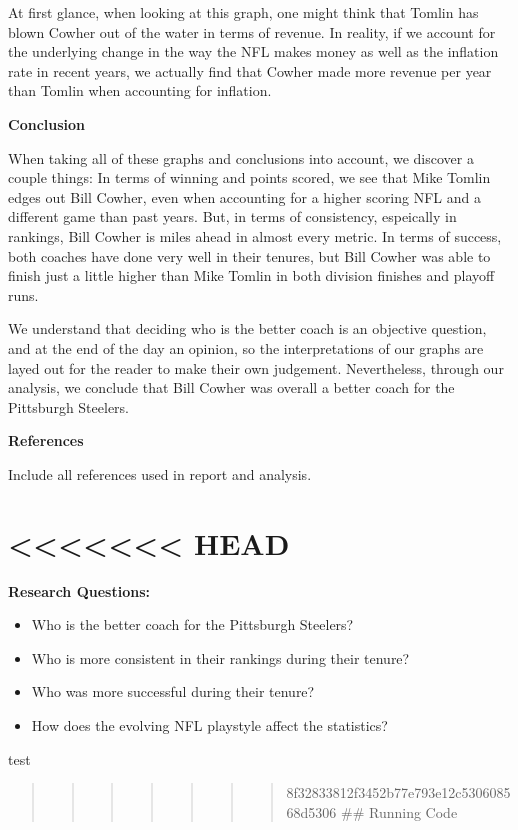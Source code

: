\documentclass[
  letterpaper,
  DIV=11,
  numbers=noendperiod]{scrartcl}
\begin{document}
At first glance, when looking at this graph, one might think that Tomlin
has blown Cowher out of the water in terms of revenue. In reality, if we
account for the underlying change in the way the NFL makes money as well
as the inflation rate in recent years, we actually find that Cowher made
more revenue per year than Tomlin when accounting for inflation.

\textbf{Conclusion}

When taking all of these graphs and conclusions into account, we
discover a couple things: In terms of winning and points scored, we see
that Mike Tomlin edges out Bill Cowher, even when accounting for a
higher scoring NFL and a different game than past years. But, in terms
of consistency, espeically in rankings, Bill Cowher is miles ahead in
almost every metric. In terms of success, both coaches have done very
well in their tenures, but Bill Cowher was able to finish just a little
higher than Mike Tomlin in both division finishes and playoff runs.

We understand that deciding who is the better coach is an objective
question, and at the end of the day an opinion, so the interpretations
of our graphs are layed out for the reader to make their own judgement.
Nevertheless, through our analysis, we conclude that Bill Cowher was
overall a better coach for the Pittsburgh Steelers.

\textbf{References}

Include all references used in report and analysis.

\section{\textless\textless\textless\textless\textless\textless\textless{}
HEAD}\label{head}

\textbf{Research Questions:}

\begin{itemize}
\item
  Who is the better coach for the Pittsburgh Steelers?
\item
  Who is more consistent in their rankings during their tenure?
\item
  Who was more successful during their tenure?
\item
  How does the evolving NFL playstyle affect the statistics?
\end{itemize}

test

\begin{quote}
\begin{quote}
\begin{quote}
\begin{quote}
\begin{quote}
\begin{quote}
\begin{quote}
8f32833812f3452b77e793e12c530608568d5306 \#\# Running Code
\end{quote}
\end{quote}
\end{quote}
\end{quote}
\end{quote}
\end{quote}
\end{quote}
\end{document}
